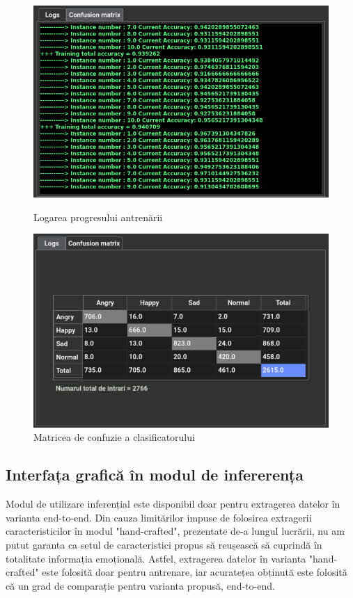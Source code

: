 \documentclass[a4paper,12pt]{book}
\begin{document}
		\begin{figure}[h]
			\hspace{-1.25cm}
			\begin{minipage}{0.60\textwidth}
				\centering
				\includegraphics[scale=0.40]{gui_train_logs}
				\caption{Logarea progresului antrenării}\label{Fig:gui_train_logs}
			\end{minipage}\hfill
		\hspace{-0.3cm}
			\begin{minipage}{0.60\textwidth}
				\centering
				\includegraphics[scale=0.399]{gui_train_tabel}
				\caption{Matricea de confuzie a clasificatorului}\label{Fig:gui_train_table}
			\end{minipage}
		\end{figure} 
		\subsection{Interfața grafică în modul de infererența}
		Modul de utilizare inferențial este disponibil doar pentru extragerea datelor în varianta end-to-end. Din cauza limitărilor impuse de folosirea extragerii caracteristicilor în modul "hand-crafted", prezentate de-a lungul lucrării, nu am putut garanta ca setul de caracteristici propus să reușească să cuprindă în totalitate informația emoțională. Astfel, extragerea datelor în varianta "hand-crafted" este folosită doar pentru antrenare, iar acuratețea obținută este folosită că un grad de comparație pentru varianta propusă, end-to-end. \par
		
\end{document}
